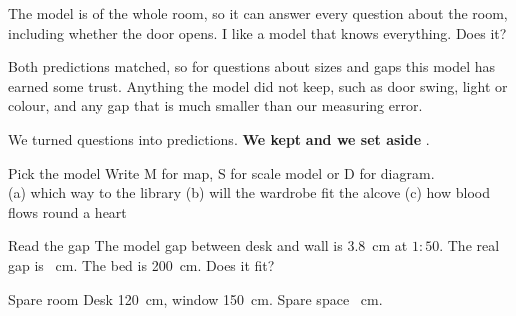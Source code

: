 \begin{center}
\end{center}

\begin{multix}[hmm]\multixbot[hmm]\tcblower
The model is of the whole room, so it can answer every question about the room, including whether the door opens. I like a model that knows everything. Does it?
\end{multix}

{Both predictions matched, so for questions about sizes and gaps this model has earned some trust.}
{Anything the model did not keep, such as door swing, light or colour, and any gap that is much smaller than our measuring error.}

\begin{keepbox}
We turned questions into predictions. \textbf{We kept} \wline[3.4cm] \textbf{and we set aside} \wline[3.4cm].
\end{keepbox}

\clearpage

\begin{puzzle}{Pick the model}
Write M for map, S for scale model or D for diagram.\\
(a) which way to the library \wline[1cm] \quad (b) will the wardrobe fit the alcove \wline[1cm] \quad (c) how blood flows round a heart \wline[1cm]
\end{puzzle}

\begin{puzzle}{Read the gap}
The model gap between desk and wall is 3.8~cm at $1:50$. The real gap is \wline[1.6cm]~cm. The bed is 200~cm. Does it fit? \wline[2cm]
\end{puzzle}

\begin{puzzle}{Spare room}
Desk 120~cm, window 150~cm. Spare space \wline[1.6cm]~cm.
\end{puzzle}

